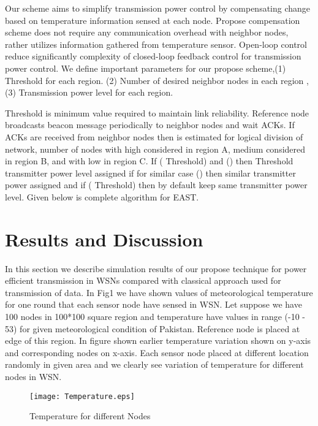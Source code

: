 \documentclass{article}
\begin{document}
 Our scheme aims to simplify transmission power control by compensating  change based on temperature information sensed at each node. Propose compensation scheme does not require any communication overhead with neighbor nodes, rather utilizes information gathered from temperature sensor. Open-loop control reduce significantly complexity of closed-loop feedback control for transmission power control. We define important parameters for our propose scheme,(1)  Threshold for each region. (2) Number of desired neighbor nodes in each region , (3) Transmission power level for each region.


Threshold  is minimum value required to maintain link reliability. Reference node broadcasts beacon message periodically to neighbor nodes and wait ACKs. If ACKs are received from neighbor nodes then  is estimated for logical division of network, number of nodes with high   considered in region A, medium  considered in region B, and with low  in region C. If (   Threshold) and  () then Threshold transmitter power level assigned if  for similar case () then similar transmitter power assigned and if  (    Threshold) then by default keep same transmitter power level. Given below is complete algorithm for EAST.


\section{Results and Discussion}
\label{sec:typestyle}

In this section we describe simulation results of our propose technique for power efficient transmission in WSNs compared with classical approach used for transmission of data. In Fig1 we have shown values of meteorological temperature for one round that each sensor node have sensed in WSN. Let suppose we have 100 nodes in 100*100  square region and temperature have values in range (-10 - 53)  \cite{8} for given meteorological condition of Pakistan. Reference node is placed at edge of this region. In figure shown earlier temperature variation shown on y-axis and corresponding nodes on x-axis. Each sensor node placed at different location randomly in given area and we clearly see variation of temperature for different nodes in WSN.

\begin{figure}[h]
\begin{center}
\texttt{[image: Temperature.eps]}
\vspace{-0.5cm}
\caption{Temperature for different Nodes}
\end{center}
\end{figure}
\end{document}
